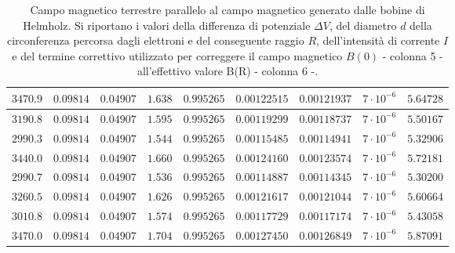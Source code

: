 \documentclass[]{article}
\begin{document}
\begin{table}
\begin{tabular}{||c|c|c|c|c|c|c|c|c||}
    $3470.9$ & $0.09814$ & $0.04907$ & $1.638$ & $0.995265$ & $0.00122515$ & $0.00121937$ & $7 \cdot 10^{-6}$ & $5.64728$ \\\hline
    $3190.8$ & $0.09814$ & $0.04907$ & $1.595$ & $0.995265$ & $0.00119299$ & $0.00118737$ & $7 \cdot 10^{-6}$ & $5.50167$ \\\hline
    $2990.3$ & $0.09814$ & $0.04907$ & $1.544$ & $0.995265$ & $0.00115485$ & $0.00114941$ & $7 \cdot 10^{-6}$ & $5.32906$ \\\hline
    $3440.0$ & $0.09814$ & $0.04907$ & $1.660$ & $0.995265$ & $0.00124160$ & $0.00123574$ & $7 \cdot 10^{-6}$ & $5.72181$ \\\hline
    $2990.7$ & $0.09814$ & $0.04907$ & $1.536$ & $0.995265$ & $0.00114887$ & $0.00114345$ & $7 \cdot 10^{-6}$ & $5.30200$ \\\hline
    $3260.5$ & $0.09814$ & $0.04907$ & $1.626$ & $0.995265$ & $0.00121617$ & $0.00121044$ & $7 \cdot 10^{-6}$ & $5.60664$ \\\hline
    $3010.8$ & $0.09814$ & $0.04907$ & $1.574$ & $0.995265$ & $0.00117729$ & $0.00117174$ & $7 \cdot 10^{-6}$ & $5.43058$ \\\hline
    $3470.0$ & $0.09814$ & $0.04907$ & $1.704$ & $0.995265$ & $0.00127450$ & $0.00126849$ & $7 \cdot 10^{-6}$ & $5.87091$ \\\hline

\end{tabular}
    \caption{Campo magnetico terrestre parallelo al campo magnetico generato dalle bobine di Helmholz. Si riportano i valori della differenza di potenziale $\Delta V$, del diametro $ d $ della circonferenza percorsa dagli elettroni e del conseguente raggio $ R $, dell'intensità di corrente $ I $ e del termine correttivo utilizzato per correggere il campo magnetico $B(0)$ - colonna 5 - all'effettivo valore B(R) - colonna 6 -.}
    \label{CM_parallelo}
\end{table}
\end{document}
